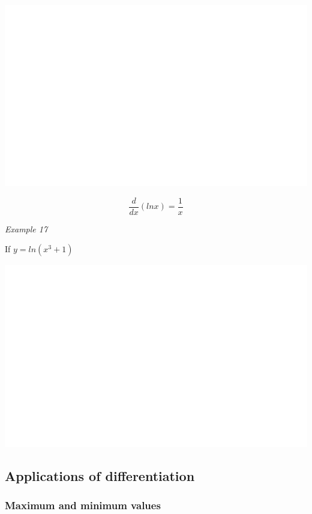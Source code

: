 \documentclass[]{book}
\begin{document}
\begin{center}\includegraphics[width=1\linewidth]{figure/LB28-1} \end{center}

\[\frac{d}{dx}(lnx)= \frac{1}{x}\]

\emph{Example 17}

If \(y=ln(x^3+1)\)

\begin{center}\includegraphics[width=1\linewidth]{figure/LB29-1} \end{center}

\hypertarget{applications-of-differentiation}{%
\subsection{Applications of differentiation}\label{applications-of-differentiation}}

\hypertarget{maximum-and-minimum-values}{%
\subsubsection{Maximum and minimum values}\label{maximum-and-minimum-values}}
\end{document}
